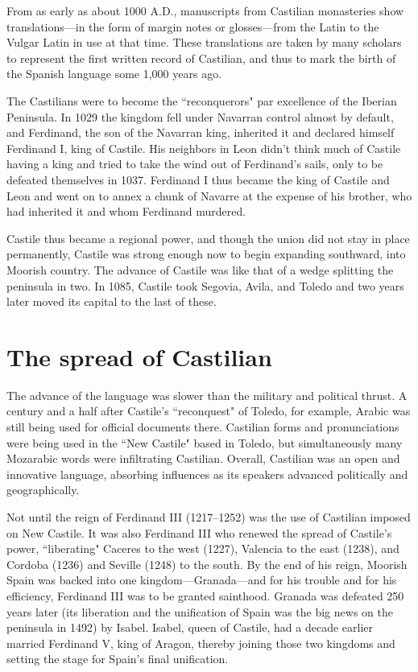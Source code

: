 From as early as about 1000 A.D., manuscripts from Castilian
monasteries show translations---in the form of margin notes or glosses---from the Latin to the Vulgar Latin in use at that time. These translations are taken by many scholars to represent the first written record
of Castilian, and thus to mark the birth of the Spanish language some
1,000 years ago.

The Castilians were to become the ``reconquerors" par excellence of the Iberian Peninsula. In 1029 the kingdom fell under Navarran control almost by default, and Ferdinand, the son of the Navarran
king, inherited it and declared himself Ferdinand I, king of Castile. His
neighbors in Leon didn't think much of Castile having a king and tried
to take the wind out of Ferdinand's sails, only to be defeated themselves in 1037. Ferdinand I thus became the king of Castile and Leon
and went on to annex a chunk of Navarre at the expense of his brother,
who had inherited it and whom Ferdinand murdered.

Castile thus became a regional power, and though the union
did not stay in place permanently, Castile was strong enough now
to begin expanding southward, into Moorish country. The advance
of Castile was like that of a wedge splitting the peninsula in two.
In 1085, Castile took Segovia, Avila, and Toledo and two years later
moved its capital to the last of these.

\section{The spread of Castilian}

The advance of the language was slower than the military and
political thrust. A century and a half after Castile's ``reconquest" of Toledo, for example, Arabic was still being used for official documents
there. Castilian forms and pronunciations were being used in the ``New
Castile" based in Toledo, but simultaneously many Mozarabic words
were infiltrating Castilian. Overall, Castilian was an open and innovative language, absorbing influences as its speakers advanced politically
and geographically.

Not until the reign of Ferdinand III (1217--1252) was the use
of Castilian imposed on New Castile. It was also Ferdinand III who renewed the spread of Castile's power, ``liberating" Caceres to the west
(1227), Valencia to the east (1238), and Cordoba (1236) and Seville
(1248) to the south. By the end of his reign, Moorish Spain was backed
into one kingdom---Granada---and for his trouble and for his efficiency,
Ferdinand III was to be granted sainthood. Granada was defeated 250
years later (its liberation and the unification of Spain was the big news
on the peninsula in 1492) by Isabel. Isabel, queen of Castile, had a decade earlier married Ferdinand V, king of Aragon, thereby joining those
two kingdoms and setting the stage for Spain's final unification.

